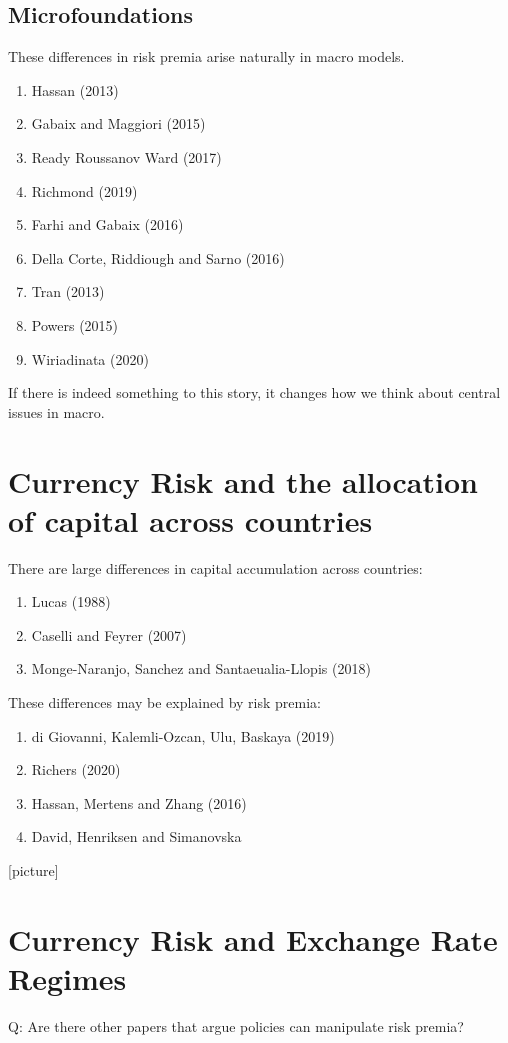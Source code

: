 \documentclass[12pt,letter]{article}
\theoremstyle{break} \theorembodyfont{\normalfont\itshape}
\theoremstyle{break}
\theoremstyle{break} \theorembodyfont{\normalfont\itshape}
\theoremstyle{break} \theorembodyfont{\normalfont\itshape}
\begin{document}
\subsection{Microfoundations}
These differences in risk premia arise naturally in macro models.
\begin{enumerate}
\item Hassan (2013)
\item Gabaix and Maggiori (2015)
\item Ready Roussanov Ward (2017)
\item Richmond (2019)
\item Farhi and Gabaix (2016)
\item Della Corte, Riddiough and Sarno (2016)
\item Tran (2013)
\item Powers (2015)
\item Wiriadinata (2020)
\end{enumerate}



If there is indeed something to this story, it changes how we think
about central issues in macro.

\section{Currency Risk and the allocation of capital across countries}
There are large differences in capital accumulation across countries:
\begin{enumerate}
\item Lucas (1988)
\item Caselli and Feyrer (2007)
\item Monge-Naranjo, Sanchez and Santaeualia-Llopis (2018)
\end{enumerate}
These differences may be explained by risk premia:
\begin{enumerate}
\item di Giovanni, Kalemli-Ozcan, Ulu, Baskaya (2019)
\item Richers (2020)
\item Hassan, Mertens and Zhang (2016)
\item David, Henriksen and Simanovska
\end{enumerate}
[picture]
\section{Currency Risk and Exchange Rate Regimes}
Q: Are there other papers that argue policies can manipulate risk premia?
\end{document}
